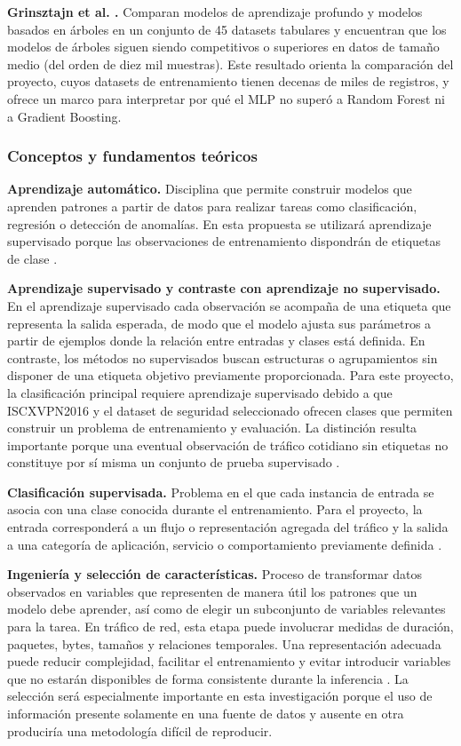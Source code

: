 \documentclass[conference]{IEEEtran}
\begin{document}
\textbf{Grinsztajn et al. \cite{grinsztajn2022}.} Comparan modelos de aprendizaje profundo y modelos basados en árboles en un conjunto de 45 datasets tabulares y encuentran que los modelos de árboles siguen siendo competitivos o superiores en datos de tamaño medio (del orden de diez mil muestras). Este resultado orienta la comparación del proyecto, cuyos datasets de entrenamiento tienen decenas de miles de registros, y ofrece un marco para interpretar por qué el MLP no superó a Random Forest ni a Gradient Boosting.

\subsubsection{Conceptos y fundamentos teóricos}

\textbf{Aprendizaje automático.} Disciplina que permite construir modelos que aprenden patrones a partir de datos para realizar tareas como clasificación, regresión o detección de anomalías. En esta propuesta se utilizará aprendizaje supervisado porque las observaciones de entrenamiento dispondrán de etiquetas de clase \cite{geron2022,bishop2024}.

\textbf{Aprendizaje supervisado y contraste con aprendizaje no supervisado.} En el aprendizaje supervisado cada observación se acompaña de una etiqueta que representa la salida esperada, de modo que el modelo ajusta sus parámetros a partir de ejemplos donde la relación entre entradas y clases está definida. En contraste, los métodos no supervisados buscan estructuras o agrupamientos sin disponer de una etiqueta objetivo previamente proporcionada. Para este proyecto, la clasificación principal requiere aprendizaje supervisado debido a que ISCXVPN2016 y el dataset de seguridad seleccionado ofrecen clases que permiten construir un problema de entrenamiento y evaluación. La distinción resulta importante porque una eventual observación de tráfico cotidiano sin etiquetas no constituye por sí misma un conjunto de prueba supervisado \cite{geron2022,bishop2024}.

\textbf{Clasificación supervisada.} Problema en el que cada instancia de entrada se asocia con una clase conocida durante el entrenamiento. Para el proyecto, la entrada corresponderá a un flujo o representación agregada del tráfico y la salida a una categoría de aplicación, servicio o comportamiento previamente definida \cite{geron2022,bishop2024}.

\textbf{Ingeniería y selección de características.} Proceso de transformar datos observados en variables que representen de manera útil los patrones que un modelo debe aprender, así como de elegir un subconjunto de variables relevantes para la tarea. En tráfico de red, esta etapa puede involucrar medidas de duración, paquetes, bytes, tamaños y relaciones temporales. Una representación adecuada puede reducir complejidad, facilitar el entrenamiento y evitar introducir variables que no estarán disponibles de forma consistente durante la inferencia \cite{geron2022,bishop2024}. La selección será especialmente importante en esta investigación porque el uso de información presente solamente en una fuente de datos y ausente en otra produciría una metodología difícil de reproducir.
\end{document}
